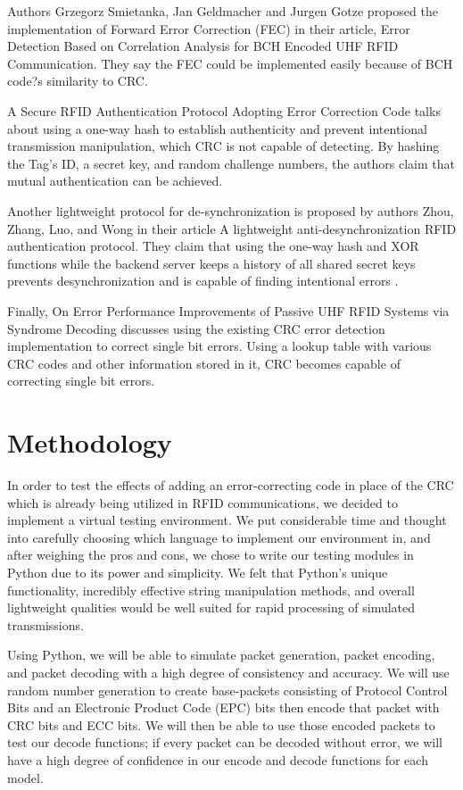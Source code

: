\documentclass{sigcomm-alternate}
\begin{document}
Authors Grzegorz Smietanka, Jan Geldmacher and Jurgen Gotze proposed the implementation of Forward Error Correction (FEC) in their article, Error Detection Based on Correlation Analysis for BCH Encoded UHF RFID Communication\cite{1}. They say the FEC could be implemented easily because of BCH code?s similarity to CRC. 

A Secure RFID Authentication Protocol Adopting Error Correction Code talks about using a one-way hash to establish authenticity and prevent intentional transmission manipulation, which CRC is not capable of detecting. By hashing the Tag's ID, a secret key, and random challenge numbers, the authors claim that mutual authentication can be achieved\cite{5}.

Another lightweight protocol for de-synchronization is proposed by authors Zhou, Zhang, Luo, and Wong in their article A lightweight anti-desynchronization RFID authentication protocol. They claim that using the one-way hash and XOR functions while the backend server keeps a history of all shared secret keys prevents desynchronization and is capable of finding intentional errors \cite{4}.

Finally, On Error Performance Improvements of Passive UHF RFID Systems via Syndrome Decoding discusses using the existing CRC error detection implementation to correct single bit errors. Using a lookup table with various CRC codes and other information stored in it, CRC becomes capable of correcting single bit errors\cite{2}.

\section{Methodology}
In order to test the effects of adding an error-correcting code in place of the CRC which is already being utilized in RFID communications, we decided to implement a virtual testing environment. We put considerable time and thought into carefully choosing which language to implement our environment in, and after weighing the pros and cons, we chose to write our testing modules in Python due to its power and simplicity. We felt that Python's unique functionality, incredibly effective string manipulation methods, and overall lightweight qualities would be well suited for rapid processing of simulated transmissions.

Using Python, we will be able to simulate packet generation, packet encoding, and packet decoding with a high degree of consistency and accuracy. We will use random number generation to create base-packets consisting of Protocol Control Bits and an Electronic Product Code (EPC) bits then encode that packet with CRC bits and ECC bits. We will then be able to use those encoded packets to test our decode functions; if every packet can be decoded without error, we will have a high degree of confidence in our encode and decode functions for each model.
\end{document}
